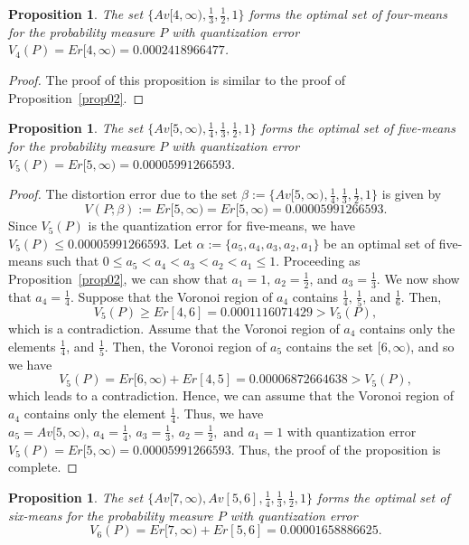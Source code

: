 \documentclass[12pt, reqno]{amsart}
\theoremstyle{plain}
\newtheorem{prop}[subsection]{Proposition}
\theoremstyle{definition}
\newcommand{\set}[1]{\{#1\}}%
\newcommand{\ga}{\alpha}
\newcommand{\gb}{\beta}
\newcommand{\te}{\text}%
\begin{document}
\begin{prop} \label{prop03}
The set $\set{Av[4, \infty), \frac 13, \frac 12, 1}$ forms the optimal set of four-means for the probability measure $P$ with quantization error $V_4(P)=Er[4, \infty)=0.0002418966477$.
\end{prop}

\begin{proof}
The proof of this proposition is similar to the proof of Proposition~\ref{prop02}.
\end{proof}


\begin{prop} \label{prop04}
The set $\set{Av[5, \infty), \frac 14, \frac 13, \frac 12, 1}$ forms the optimal set of five-means for the probability measure $P$ with quantization error $V_5(P)=Er[5, \infty)=0.00005991266593$.
\end{prop}
\begin{proof}
The distortion error due to the set $\gb:=\set{Av[5, \infty), \frac 14, \frac 13, \frac 12, 1}$ is given by
\[V(P; \gb):=Er[5, \infty)=Er[5, \infty)=0.00005991266593.\]
Since $V_5(P)$ is the quantization error for five-means, we have $V_5(P)\leq 0.00005991266593$. Let $\ga:=\set{a_5, a_4, a_3, a_2, a_1}$ be an optimal set of five-means such that $0 \leq a_5<a_4<a_3<a_2<a_1\leq 1$. Proceeding as Proposition~\ref{prop02}, we can show that $a_1=1, \, a_2=\frac 12$, and $a_3=\frac 13$. We now show that $a_4=\frac 14$.
Suppose that the Voronoi region of $a_4$ contains $\frac 14, \, \frac 15$, and $\frac 16$.
Then,
\[V_5(P)\geq Er[4, 6]=0.0001116071429>V_5(P),\]
which is a contradiction. Assume that the Voronoi region of $a_4$ contains only the elements $\frac 14$, and $\frac 15$. Then, the Voronoi region of $a_5$ contains the set $[6, \infty)$, and so we have
 \[V_5(P)=Er[6, \infty)+Er[4, 5]=0.00006872664638>V_5(P),\]
 which leads to a contradiction. Hence, we can assume that the Voronoi region of $a_4$ contains only the element $\frac 14$. Thus, we have
$a_5=Av[5, \infty), \, a_4=\frac 14, \, a_3=\frac 13, \, a_2=\frac 12, \te{ and } a_1=1$  with quantization error $V_5(P)=Er[5, \infty)=0.00005991266593$. Thus, the proof of the proposition is complete.
\end{proof}

\begin{prop} \label{prop05}
The set $\set{Av[7, \infty), Av[5, 6],  \frac 14, \frac 13, \frac 12, 1}$ forms the optimal set of six-means for the probability measure $P$ with quantization error \[V_6(P)=Er[7, \infty)+Er[5, 6]=0.00001658886625.\]
\end{prop}
\end{document}
